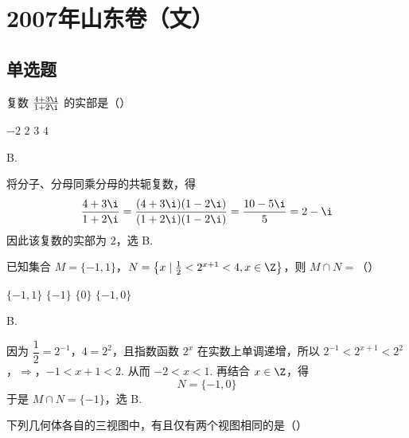 \chapter{2007年山东卷（文）}

\section{单选题}

\begin{problem}
复数 \(\frac{4 + 3\i}{1 + 2\i}\) 的实部是（\quad）

\choices
    {\(-2\)}
    {\(2\)}
    {\(3\)}
    {\(4\)}
\end{problem}

\begin{answer}
B.
\end{answer}

\begin{solution}
将分子、分母同乘分母的共轭复数，得
\[
\frac{4+3\i}{1+2\i}
=\frac{(4+3\i)(1-2\i)}{(1+2\i)(1-2\i)}
=\frac{10-5\i}{5}=2-\i
\]
因此该复数的实部为 \(2\)，选 B.
\end{solution}

\begin{problem}
已知集合 \(M = \{-1, 1\}\)，\(N = \left\{x \mid \frac{1}{2} < 2^{x+1} < 4, x \in \Z\right\}\)，则 \(M \cap N =\)（\quad）

\choices
    {\( \{-1,1\} \)}
    {\( \{-1\} \)}
    {\( \{0\} \)}
    {\( \{-1,0\} \)}
\end{problem}

\begin{answer}
B.
\end{answer}

\begin{solution}
因为 \(\dfrac12=2^{-1}\)，\(4=2^2\)，且指数函数 \(2^x\) 在实数上单调递增，所以
\(2^{-1}<2^{x+1}<2^2\)，\(\Longrightarrow\)，\(-1<x+1<2\).
从而 \(-2<x<1\). 再结合 \(x\in\Z\)，得
\[
N=\{-1,0\}
\]
于是 \(M\cap N=\{-1\}\)，选 B.
\end{solution}

\begin{problem}
下列几何体各自的三视图中，有且仅有两个视图相同的是（\quad）


\choices
    {}
    {}
    {}
    {}
\end{problem}


